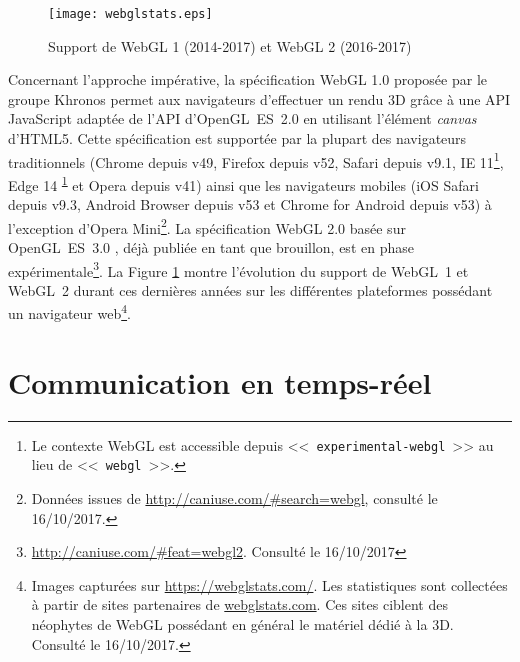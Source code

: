 
\begin{figure}[hbt]
	\centering
	\texttt{[image: webglstats.eps]}
	\caption{Support de WebGL 1 (2014-2017) et WebGL 2 
		(2016-2017)}
	\label{fig:webglstats}
\end{figure}

Concernant l'approche impérative, la spécification WebGL 1.0 \cite{Khronos2011} 
proposée par le groupe Khronos permet aux navigateurs d'effectuer un rendu 
\gls{3D} 
grâce à une \gls{API} JavaScript adaptée de l'\gls{API} d'OpenGL~ES~2.0 
\cite{Khronos2007} en utilisant l'élément \textit{canvas} d'\gls{HTML}5. Cette 
spécification est supportée par la plupart des navigateurs traditionnels (Chrome 
depuis v49, Firefox depuis v52, Safari depuis v9.1, IE 11\footnote{Le contexte 
	WebGL est accessible depuis <<~\texttt{experimental-webgl}~>> au lieu de 
	<<~\texttt{webgl}~>>.\label{fn:webglcontext}}, Edge 14\textsuperscript{ 
	\ref{fn:webglcontext}} et Opera depuis v41) ainsi que les navigateurs mobiles 
	(iOS 
Safari depuis v9.3, Android Browser depuis v53 et Chrome for Android depuis v53) 
à l'exception d'Opera Mini\footnote{Données issues de 
	\url{http://caniuse.com/\#search=webgl}, consulté le 16/10/2017.}. La 
	spécification 
WebGL 2.0 \cite{Khronos2016} basée sur OpenGL~ES~3.0 \cite{Khronos2008}, 
déjà publiée en tant que brouillon, est en phase 
expérimentale\footnote{\url{http://caniuse.com/\#feat=webgl2}. Consulté le 
	16/10/2017}. La Figure 
\ref{fig:webglstats} montre l'évolution du support de WebGL~1 et WebGL~2 durant 
ces dernières années sur les différentes plateformes possédant un navigateur 
web\footnote{Images capturées sur \url{https://webglstats.com/}. Les statistiques 
	sont collectées à partir de sites partenaires de \url{webglstats.com}. Ces sites 
	ciblent des néophytes de WebGL possédant  en général le matériel 
	dédié à la \gls{3D}. Consulté le 16/10/2017.}.

\section{Communication en temps-réel}

